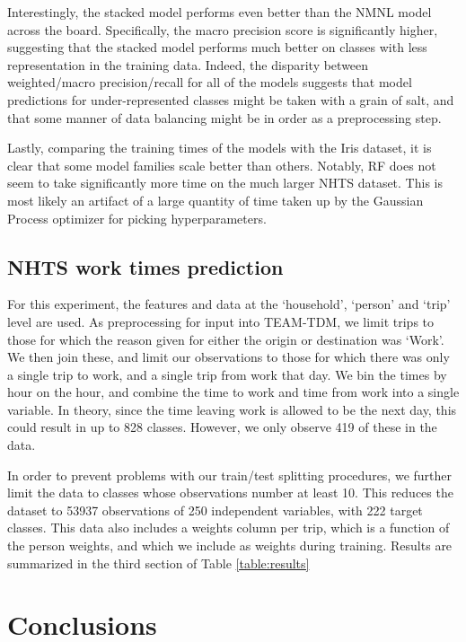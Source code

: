 \documentclass[conference]{IEEEtran}
\begin{document}
Interestingly, the stacked model performs even better than the NMNL model across the board.
 Specifically, the macro precision score is significantly higher, suggesting that the stacked model performs much better on classes with less representation in the training data.
 Indeed, the disparity between weighted/macro precision/recall for all of the models suggests that model predictions for under-represented classes might be taken with a grain of salt, and that some manner of data balancing might be in order as a preprocessing step.

Lastly, comparing the training times of the models with the Iris dataset, it is clear that some model families scale better than others.
 Notably, RF does not seem to take significantly more time on the much larger NHTS dataset.
 This is most likely an artifact of a large quantity of time taken up by the Gaussian Process optimizer for picking hyperparameters.

\subsection{NHTS work times prediction}\label{subsection:work}

For this experiment, the features and data at the `household', `person' and `trip' level are used.
 As preprocessing for input into TEAM-TDM, we limit trips to those for which the reason given for either the origin or destination was `Work'.
 We then join these, and limit our observations to those for which there was only a single trip to work, and a single trip from work that day.
 We bin the times by hour on the hour, and combine the time to work and time from work into a single variable.
 In theory, since the time leaving work is allowed to be the next day, this could result in up to 828 classes.
 However, we only observe 419 of these in the data.

In order to prevent problems with our train/test splitting procedures, we further limit the data to classes whose observations number at least 10.
 This reduces the dataset to 53937 observations of 250 independent variables, with 222 target classes.
 This data also includes a weights column per trip, which is a function of the person weights, and which we include as weights during training.
 Results are summarized in the third section of Table \ref{table:results}




\section{Conclusions}\label{section:conclusions}
 
\end{document}
